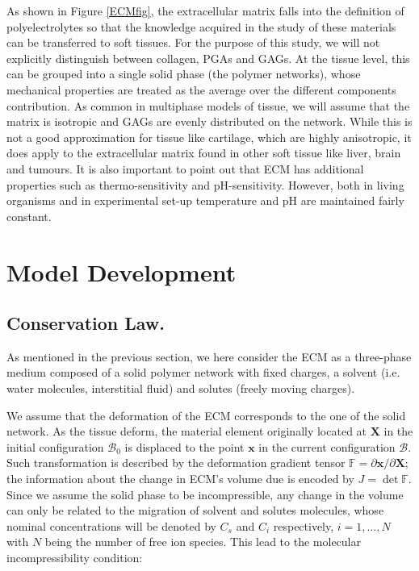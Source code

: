 \documentclass[runningheads]{llncs}
\newcommand{\F}{\ensuremath{\mathbb{F}}}
\begin{document}
As shown in Figure \ref{ECMfig}, the extracellular matrix falls into the definition of polyelectrolytes so that the knowledge acquired in the study of these materials can be transferred to soft tissues. For the purpose of this study, we will not explicitly distinguish between collagen, PGAs and GAGs. At the tissue level, this can be grouped into a single solid phase (the polymer networks), whose mechanical properties are treated as the average over the different components contribution. As common in multiphase models of tissue, we will assume that the matrix is isotropic and GAGs are evenly distributed on the network. While this is not a good approximation for tissue like cartilage, which are highly anisotropic, it does apply to the extracellular matrix found in other soft tissue like liver, brain and tumours. It is also important to point out that ECM has additional properties such as thermo-sensitivity and pH-sensitivity. However, both in living organisms and in experimental set-up temperature and pH are maintained fairly constant.

\section{Model Development}
\label{modeldev}
\subsection{Conservation Law.}
\label{conslaw}
As mentioned in the previous section, we here consider the ECM as a three-phase medium composed of a solid polymer network with fixed charges, a solvent (i.e. water molecules, interstitial fluid) and solutes (freely moving charges). 

We assume that the deformation of the ECM corresponds to the one of the solid network. As the tissue deform, the material element originally located at $\mathbf{X}$ in the initial configuration $\mathcal{B}_0$ is displaced to the point $\mathbf{x}$ in the current configuration $\mathcal{B}$. Such transformation is described by the deformation gradient tensor $\F= \partial \mathbf{x}/\partial \mathbf{X}$; the information about the change in ECM's volume due is encoded by $J= \det \F$. Since we assume the solid phase to be incompressible, any change in the volume can only be related to the migration of solvent and solutes molecules, whose nominal concentrations will be denoted by $C_s$ and $C_i$ respectively, $i=1,\ldots,N$ with $N$ being the number of free ion species. This lead to the molecular incompressibility condition:
\end{document}
